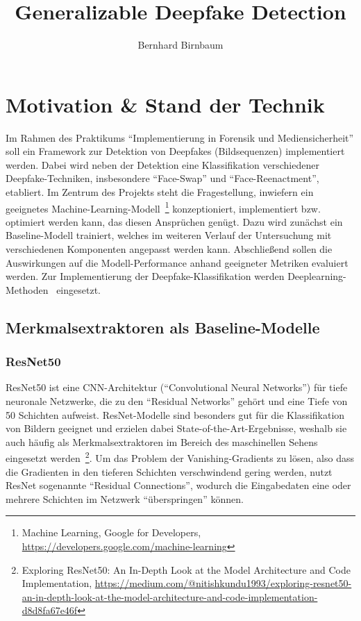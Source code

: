\documentclass{article}
\title{Generalizable Deepfake Detection}
\author{Bernhard Birnbaum}
\begin{document}
    \maketitle

    \section{Motivation \& Stand der Technik}
    Im Rahmen des Praktikums \enquote{Implementierung in Forensik und Mediensicherheit} soll ein Framework zur Detektion von Deepfakes (Bildsequenzen) implementiert werden.
    Dabei wird neben der Detektion eine Klassifikation verschiedener Deepfake-Techniken, insbesondere \enquote{Face-Swap} und \enquote{Face-Reenactment}, etabliert.
    Im Zentrum des Projekts steht die Fragestellung, inwiefern ein geeignetes Machine-Learning-Modell~\footnote{Machine Learning, Google for Developers, \url{https://developers.google.com/machine-learning}} konzeptioniert, implementiert bzw. optimiert werden kann, das diesen Ansprüchen genügt.
    Dazu wird zunächst ein Baseline-Modell trainiert, welches im weiteren Verlauf der Untersuchung mit verschiedenen Komponenten angepasst werden kann.
    Abschließend sollen die Auswirkungen auf die Modell-Performance anhand geeigneter Metriken evaluiert werden.
    Zur Implementierung der Deepfake-Klassifikation werden Deeplearning-Methoden~\cite{deeplearningbook} eingesetzt.
    \subsection{Merkmalsextraktoren als Baseline-Modelle}
    \subsubsection{ResNet50}
    ResNet50 ist eine CNN-Architektur (\enquote{Convolutional Neural Networks}) für tiefe neuronale Netzwerke, die zu den \enquote{Residual Networks} gehört und eine Tiefe von 50 Schichten aufweist.
    ResNet-Modelle sind besonders gut für die Klassifikation von Bildern geeignet und erzielen dabei State-of-the-Art-Ergebnisse, weshalb sie auch häufig als Merkmalsextraktoren im Bereich des maschinellen Sehens eingesetzt werden~\footnote{Exploring ResNet50: An In-Depth Look at the Model Architecture and Code Implementation, \url{https://medium.com/@nitishkundu1993/exploring-resnet50-an-in-depth-look-at-the-model-architecture-and-code-implementation-d8d8fa67e46f}}.
    Um das Problem der Vanishing-Gradients zu lösen, also dass die Gradienten in den tieferen Schichten verschwindend gering werden, nutzt ResNet sogenannte \enquote{Residual Connections}, wodurch die Eingabedaten eine oder mehrere Schichten im Netzwerk \enquote{überspringen} können.
\end{document}
